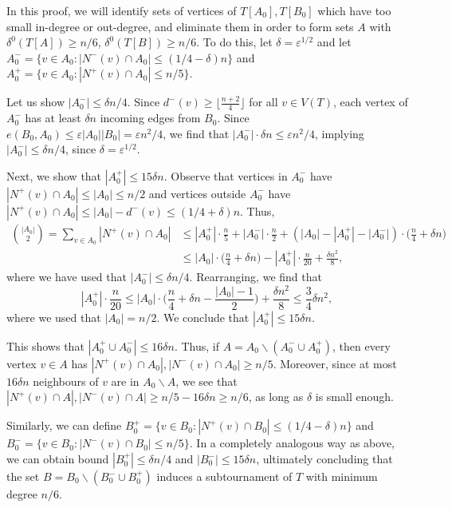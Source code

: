 \documentclass[a4paper,11pt]{article}
\makeatletter
\renewenvironment{proof}[1][\proofname] {\par\pushQED{\qed}\normalfont\topsep6\p@\@plus6\p@\relax\trivlist\item[\hskip\labelsep\textit{#1}\@addpunct{.}]\ignorespaces}{\popQED\endtrivlist\@endpefalse}
\theoremstyle{definition}
\def\eps{\varepsilon}
\makeatother
\begin{document}
\begin{proof}[Proof of Lemma~\ref{lemma:good partitions exist}.]
In this proof, we will identify sets of vertices of $T[A_0], T[B_0]$ which have too small in-degree or out-degree, and eliminate them in order to form sets $A$ with $\delta^0(T[A])\geq n/6$, $\delta^0(T[B])\geq n/6$. To do this, let $\delta=\eps^{1/2}$ and let $A_0^-=\{v\in A_0: |N^-(v)\cap A_0|\leq (1/4-\delta)n\}$ and $A_0^+=\{v\in A_0: |N^+(v)\cap A_0|\leq n/5\}$.

Let us show $|A_0^-|\leq \delta n/4$. Since $d^-(v)\geq \lfloor \frac{n+2}{4}\rfloor$ for all $v\in V(T)$, each vertex of $A_0^-$ has at least $\delta n$ incoming edges from $B_0$. Since $e(B_0, A_0)\leq \eps |A_0||B_0|=\eps n^2/4$, we find that $|A_0^-|\cdot \delta n\leq \eps n^2/4$, implying $|A_0^-|\leq \delta n/4$, since $\delta=\eps^{1/2}$. 

Next, we show that $|A_0^+|\leq 15\delta n$. Observe that vertices in $A_0^-$ have $|N^+(v)\cap A_0|\leq |A_0|\leq n/2$ and vertices outside $A_0^-$ have $|N^+(v)\cap A_0|\leq |A_0|-d^-(v)\leq (1/4+\delta)n$. Thus, 
\begin{align*}
\binom{|A_0|}{2}=\sum_{v\in A_0}|N^+(v)\cap A_0|&\leq |A_0^+|\cdot \frac{n}{5}+|A_0^-|\cdot \frac{n}{2}+(|A_0|-|A_0^+|-|A_0^-|)\cdot \Big(\frac{n}{4}+\delta n\Big)\\
&\leq |A_0|\cdot \Big(\frac{n}{4}+\delta n\Big) - |A_0^+|\cdot \frac{n}{20}+\frac{\delta n^2}{8},
\end{align*}
where we have used that $|A_0^-|\leq \delta n/4$. Rearranging, we find that 
\[|A_0^+|\cdot \frac{n}{20}\leq |A_0|\cdot \Big(\frac{n}{4}+\delta n-\frac{|A_0|-1}{2}\Big) + \frac{\delta n^2}{8}\leq \frac{3}{4}\delta n^2,\]
where we used that $|A_0|=n/2$. We conclude that $|A_0^+|\leq 15\delta n$. 

This shows that $|A_0^+\cup A_0^-|\leq 16 \delta n$. Thus, if $A=A_0\backslash (A_0^-\cup A_0^+)$, then every vertex $v\in A$ has $|N^+(v)\cap A_0|, |N^-(v)\cap A_0|\geq n/5$. Moreover, since at most $16\delta n$ neighbours of $v$ are in $A_0\backslash A$, we see that $|N^+(v)\cap A|, |N^-(v)\cap A|\geq n/5-16\delta n\geq n/6$, as long as $\delta$ is small enough.

Similarly, we can define $B_0^+=\{v\in B_0: |N^+(v)\cap B_0|\leq (1/4-\delta)n\}$ and $B_0^-=\{v\in B_0: |N^-(v)\cap B_0|\leq n/5\}$. In a completely analogous way as above, we can obtain bound $|B_0^+|\leq \delta n/4$ and $|B_0^-|\leq 15\delta n$, ultimately concluding that the set $B=B_0\backslash (B_0^-\cup B_0^+)$ induces a subtournament of $T$ with minimum degree $n/6$.


\end{proof}
\end{document}

